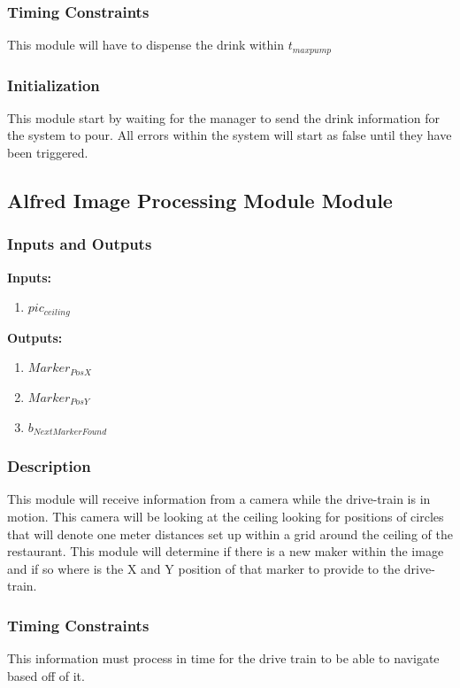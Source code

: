 \documentclass [10pt]{article}
\begin{document}
\subsubsection{Timing Constraints}
This module will have to dispense the drink within $ t_{maxpump} $

\subsubsection{Initialization}
This module start by waiting for the manager to send the drink information for the system to pour. All errors within the system will start as false until they have been triggered.
\subsection{Alfred Image Processing Module Module}

\subsubsection{Inputs and Outputs}

\textbf{Inputs: } 
\begin{enumerate}
	\item $ pic_{ceiling} $
\end{enumerate}

\textbf{Outputs: } 
\begin{enumerate}
	\item $ Marker_{PosX} $
	\item $ Marker_{PosY} $
	\item $ b_{NextMarkerFound} $
	
\end{enumerate}

\subsubsection{Description}
This module will receive information from a camera while the drive-train is in motion. This camera will be looking at the ceiling looking for positions of circles that will denote one meter distances set up within a grid around the ceiling of the restaurant. This module will determine if there is a new maker within the image and if so where is the X and Y position of that marker to provide to the drive-train.

\subsubsection{Timing Constraints}
This information must process in time for the drive train to be able to navigate based off of it.
\end{document}
